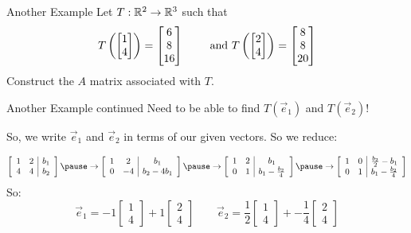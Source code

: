 \documentclass[xcoler=dvipsnames, aspectratio=169]{beamer}
\begin{document}
\begin{frame}{Another Example}
    Let $T:\mathbb{R}^2\rightarrow\mathbb{R}^3$ such that
    \[
        T\left(\begin{bmatrix}1\\4\end{bmatrix}\right) = \begin{bmatrix}6\\8\\16\end{bmatrix}\qquad\textnormal{ and }
            T\left(\begin{bmatrix}2\\4\end{bmatrix}\right) = \begin{bmatrix}8\\8\\20\end{bmatrix}
    \]
    Construct the $A$ matrix associated with $T$.
\end{frame}
\begin{frame}{Another Example continued}
    Need to be able to find $T(\vec{e}_1)$ and $T(\vec{e}_2)$!\pause

    So, we write $\vec{e}_1$ and $\vec{e}_2$ in terms of our given vectors. So we reduce:

    \[
        \aMat{cc|c}{
            1&2&b_1\\
            4&4&b_2
        }\pause\rightarrow\aMat{cc|c}{
            1&2&b_1\\
            0&-4&b_2-4b_1
        }\pause\rightarrow\aMat{cc|c}{
            1&2&b_1\\
            0&1&b_1-\frac{b_2}{4}
        }\pause\rightarrow\aMat{cc|c}{
            1&0&\frac{b_2}{2}-b_1\\
            0&1&b_1-\frac{b_2}{4}
        }
    \]
    So:\pause
    \[
        \vec{e}_1 = -1\begin{bmatrix}1\\4\end{bmatrix}+1\begin{bmatrix}2\\4\end{bmatrix}
            \qquad\vec{e}_2 = \frac{1}{2}\begin{bmatrix}1\\4\end{bmatrix}+
                -\frac{1}{4}\begin{bmatrix}2\\4\end{bmatrix}
    \]
\end{frame}
\end{document}
